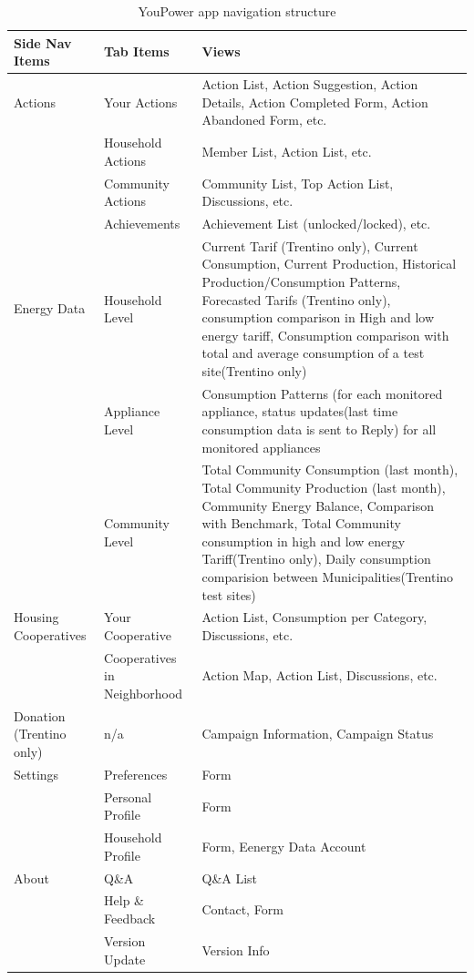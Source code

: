 \begin{table}
\caption{YouPower app navigation structure}\label{tab:app_nav}
\begin{center} \footnotesize 
\begin{tabular}{ l l p{6cm}}
\hline
\textbf{Side Nav Items}  &
\textbf{Tab Items}  &
\textbf{Views}  \\ \hline

Actions & Your Actions & Action List, Action Suggestion, Action Details, Action Completed Form, Action Abandoned Form, etc.\\ 
& Household Actions & Member List, Action List, etc. \\ 
& Community Actions & Community List, Top Action List, Discussions, etc.\\ 
& Achievements & Achievement List (unlocked/locked), etc.\\  \hline

Energy Data  & Household Level  & Current Tarif (Trentino only), Current Consumption, Current Production, Historical Production/Consumption Patterns, Forecasted Tarifs (Trentino only), consumption comparison in High and low energy tariff, Consumption comparison with total and average consumption of a test site(Trentino only) \\ 
& Appliance Level & Consumption Patterns (for each monitored appliance, status updates(last time consumption data is sent to Reply) for all monitored appliances\\ 
&  Community Level & Total Community Consumption (last month), Total Community Production (last month), Community Energy Balance, Comparison with Benchmark, Total Community consumption in high and low energy Tariff(Trentino only), Daily consumption comparision between Municipalities(Trentino test sites)\\  \hline

Housing Cooperatives & Your Cooperative & Action List, Consumption per Category, Discussions, etc. \\ 
& Cooperatives in Neighborhood&  Action Map, Action List, Discussions, etc. \\  \hline

Donation (Trentino only) & n/a & Campaign Information, Campaign Status \\
\hline

Settings & Preferences & Form \\ 
& Personal Profile & Form \\ 
& Household Profile & Form, Eenergy Data Account \\  \hline

About & Q\&A & Q\&A List \\ 
& Help \& Feedback & Contact, Form\\ 
& Version Update & Version Info\\  \hline
\end{tabular}
\end{center} 
\end{table}

